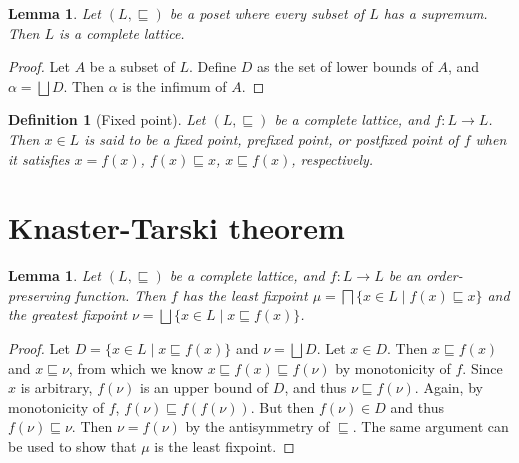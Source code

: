 \documentclass{article}
\newtheorem{lemma}[theorem]{Lemma}
\newtheorem{definition}[theorem]{Definition}
\begin{document}
  \begin{lemma}
    Let $(L,\sqsubseteq)$ be a poset where every subset of $L$ has a supremum. Then $L$ is a complete lattice.
  \end{lemma}
  \begin{proof}
    Let $A$ be a subset of $L$.
    Define $D$ as the set of lower bounds of $A$, and $\alpha = \bigsqcup D$.
    Then $\alpha$ is the infimum of $A$.
  \end{proof}

  \begin{definition}[Fixed point]
    Let $(L,\sqsubseteq)$ be a complete lattice, and $f : L \to L$.
    Then $x \in L$ is said to be a fixed point, prefixed point, or postfixed point of $f$ when
    it satisfies $x = f(x)$, $f(x) \sqsubseteq x$, $x \sqsubseteq f(x)$, respectively.
  \end{definition}

\section{Knaster-Tarski theorem}
  \begin{lemma}
    Let $(L,\sqsubseteq)$ be a complete lattice, and $f : L \to L$ be an order-preserving function.
    Then $f$ has the least fixpoint $\mu = \bigsqcap \{x \in L \mid f(x) \sqsubseteq x\}$
    and the greatest fixpoint $\nu = \bigsqcup \{x \in L \mid x \sqsubseteq f(x)\}$.
  \end{lemma}
  \begin{proof}
    Let $D = \{x \in L \mid x \sqsubseteq f(x)\}$ and $\nu = \bigsqcup D$.
    Let $x \in D$.
    Then $x \sqsubseteq f(x)$ and $x \sqsubseteq \nu$, from which we know $x \sqsubseteq f(x) \sqsubseteq f(\nu)$ by monotonicity of $f$.
    Since $x$ is arbitrary, $f(\nu)$ is an upper bound of $D$, and thus $\nu \sqsubseteq f(\nu)$.
    Again, by monotonicity of $f$, $f(\nu) \sqsubseteq f(f(\nu))$.
    But then $f(\nu) \in D$ and thus $f(\nu) \sqsubseteq \nu$.
    Then $\nu = f(\nu)$ by the antisymmetry of $\sqsubseteq$.
    The same argument can be used to show that $\mu$ is the least fixpoint.
  \end{proof}
\end{document}
